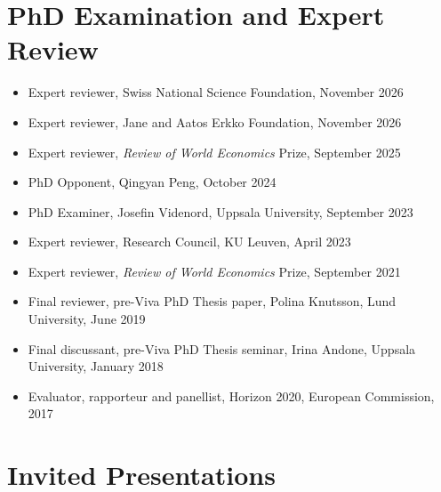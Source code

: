 \documentclass[11pt,a4paper]{article}
\newcommand{\cventry}[1]{\item #1}
\begin{document}
\section{PhD Examination and Expert Review}

\begin{itemize}
  \cventry{Expert reviewer, Swiss National Science Foundation, November 2026} %
  \cventry{Expert reviewer, Jane and Aatos Erkko Foundation, November 2026} %
  \cventry{Expert reviewer, \textit{Review of World Economics} Prize, September 2025}
  \cventry{PhD Opponent, Qingyan Peng, October 2024}
  \cventry{PhD Examiner, Josefin Videnord, Uppsala University, September 2023}
  \cventry{Expert reviewer, Research Council, KU Leuven, April 2023}
  \cventry{Expert reviewer, \textit{Review of World Economics} Prize, September 2021}
  \cventry{Final reviewer, pre-Viva PhD Thesis paper, Polina Knutsson, Lund University, June 2019}
  \cventry{Final discussant, pre-Viva PhD Thesis seminar, Irina Andone, Uppsala University, January 2018}
  \cventry{Evaluator, rapporteur and panellist, Horizon 2020, European Commission, 2017}
\end{itemize}

  
  
\section{Invited Presentations}
\end{document}
